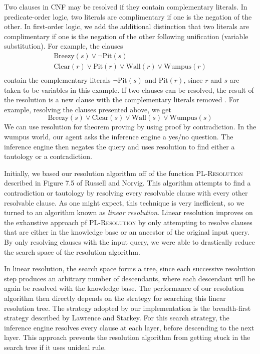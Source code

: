 \documentclass{article}
\begin{document}
Two clauses in CNF may be resolved if they contain complementary literals. In predicate-order logic, two literals are complimentary if one is the negation of the other. 
In first-order logic, we add the additional distinction that two literals are complimentary if one is the negation of the other following unification (variable substitution)\cite{ai}. 
For example, the clauses
\begin{gather*}
\text{Breezy}(s) \lor \neg \text{Pit}(s) \\
\text{Clear}(r) \lor \text{Pit}(r) \lor \text{Wall}(r) \lor \text{Wumpus}(r) \\
\end{gather*}
contain the complementary literals $\neg \text{Pit}(s)$ and $\text{Pit}(r)$, since $r$ and $s$ are taken to be variables in this example. 
If two clauses can be resolved, the result of the resolution is a new clause with the complementary literals removed \cite{ai}. 
For example, resolving the clauses presented above, we get
\begin{equation*}
\text{Breezy}(s) \lor \text{Clear}(s) \lor \text{Wall}(s) \lor \text{Wumpus}(s)
\end{equation*}
We can use resolution for theorem proving by using proof by contradiction. 
In the wumpus world, our agent asks the inference engine a yes/no question.
The inference engine then negates the query and uses resolution to find either a tautology or a contradiction.

Initially, we based our resolution algorithm off of the function \textsc{PL-Resolution} described in Figure 7.5 of Russell and Norvig. 
This algorithm attempts to find a contradiction or tautology by resolving every resolvable clause with every other resolvable clause. 
As one might expect, this technique is very inefficient, so we turned to an algorithm known as \textit{linear resolution}. 
Linear resolution improves on the exhaustive approach pf \textsc{PL-Resolution} by only attempting to resolve clauses that are either in the knowledge base or an ancestor of the original input query\cite{ai}. 
By only resolving clauses with the input query, we were able to drastically reduce the search space of the resolution algorithm.

In linear resolution, the search space forms a tree, since each successive resolution step produces an arbitrary number of descendants, where each descendant will be again be resolved with the knowledge base. 
The performance of our resolution algorithm then directly depends on the strategy for searching this linear resolution tree. 
The strategy adopted by our implementation is the breadth-first strategy described by Lawrence and Starkey. 
For this search strategy, the inference engine resolves every clause at each layer, before descending to the next layer. 
This approach prevents the resolution algorithm from getting stuck in the search tree if it uses unideal rule.
\end{document}

